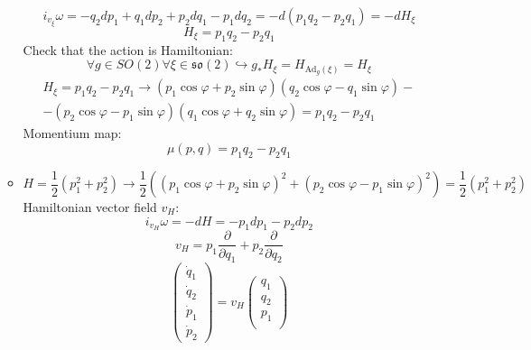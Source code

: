 \documentclass[12pt]{article}
\theoremstyle{definition}
\begin{document}
\begin{enumerate}
\begin{itemize}
        \begin{equation}
            i_{v_\xi}\omega=-q_2dp_1+q_1dp_2+p_2dq_1-p_1dq_2=-d(p_1q_2-p_2q_1)=-dH_\xi
        \end{equation}
        \begin{equation}
            H_\xi=p_1q_2-p_2q_1
        \end{equation}
        Check that the action is Hamiltonian:
        \begin{equation}
            \forall g\in SO(2)\forall\xi\in\mathfrak{so}(2)\hookrightarrow g_*H_\xi=H_{\text{Ad}_g(\xi)}=H_\xi
        \end{equation}
        \begin{multline}
            H_\xi=p_1q_2-p_2q_1\rightarrow(p_1\cos\varphi+p_2\sin\varphi)(q_2\cos\varphi-q_1\sin\varphi)-\\-(p_2\cos\varphi-p_1\sin\varphi)(q_1\cos\varphi+q_2\sin\varphi)=p_1q_2-p_2q_1
        \end{multline}
        Momentium map:
        \begin{equation}
            \boxed{\mu(p,q)=p_1q_2-p_2q_1}
        \end{equation}
        \item
        \begin{equation}
            H=\frac{1}{2}(p_1^2+p_2^2)\rightarrow\frac{1}{2}((p_1\cos\varphi+p_2\sin\varphi)^2+(p_2\cos\varphi-p_1\sin\varphi)^2)=\frac{1}{2}(p_1^2+p_2^2)
        \end{equation}
        Hamiltonian vector field $v_H$:
        \begin{equation}
            i_{v_H}\omega=-dH=-p_1dp_1-p_2dp_2
        \end{equation}
        \begin{equation}
            \boxed{v_H=p_1\frac{\partial}{\partial q_1}+p_2\frac{\partial}{\partial q_2}}
        \end{equation}
        \begin{equation}
            \begin{pmatrix}
                \dot{q}_1\\
                \dot{q}_2\\
                \dot{p}_1\\
                \dot{p}_2
            \end{pmatrix}=v_H\begin{pmatrix}
                q_1\\
                q_2\\
                p_1\\

\end{pmatrix}
\end{equation}
\end{itemize}
\end{enumerate}
\end{document}
